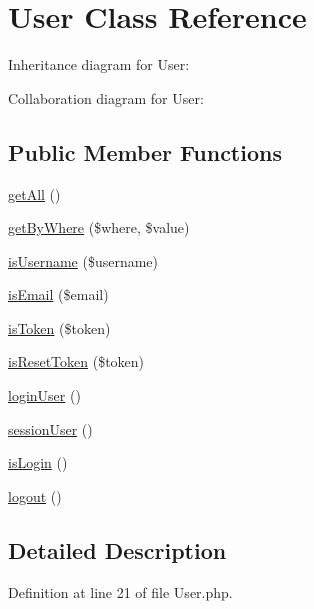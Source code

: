 \hypertarget{class_zest_1_1_auth_1_1_user}{}\section{User Class Reference}
\label{class_zest_1_1_auth_1_1_user}


Inheritance diagram for User\+:


Collaboration diagram for User\+:
\subsection*{Public Member Functions}
\begin{DoxyCompactItemize}
\item 
\mbox{\hyperlink{class_zest_1_1_auth_1_1_user_aba0d5b303383fb5b1fabb5fd01cd3800}{get\+All}} ()
\item 
\mbox{\hyperlink{class_zest_1_1_auth_1_1_user_ae74834371fb77ad40ef0845883352d19}{get\+By\+Where}} (\$where, \$value)
\item 
\mbox{\hyperlink{class_zest_1_1_auth_1_1_user_a99ae17e029c338ef8559c3d2c64b94cd}{is\+Username}} (\$username)
\item 
\mbox{\hyperlink{class_zest_1_1_auth_1_1_user_a06e51d64ebd5861dc7728adf64a226d7}{is\+Email}} (\$email)
\item 
\mbox{\hyperlink{class_zest_1_1_auth_1_1_user_a30f35759659d9838b8eaffb96d7a5d2a}{is\+Token}} (\$token)
\item 
\mbox{\hyperlink{class_zest_1_1_auth_1_1_user_a5d20a1de4d92b051e389fa8579cb6b07}{is\+Reset\+Token}} (\$token)
\item 
\mbox{\hyperlink{class_zest_1_1_auth_1_1_user_a6083b365f5ea600dd590280b73cf3f08}{login\+User}} ()
\item 
\mbox{\hyperlink{class_zest_1_1_auth_1_1_user_a94f9bad9e990d4cfcadb21615c859f9a}{session\+User}} ()
\item 
\mbox{\hyperlink{class_zest_1_1_auth_1_1_user_a143c83afc39f4761088db46dc2c9426e}{is\+Login}} ()
\item 
\mbox{\hyperlink{class_zest_1_1_auth_1_1_user_a082405d89acd6835c3a7c7a08a7adbab}{logout}} ()
\end{DoxyCompactItemize}


\subsection{Detailed Description}


Definition at line 21 of file User.\+php.




